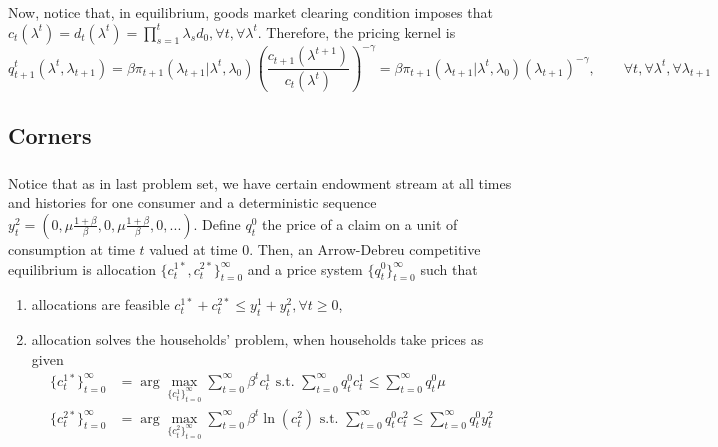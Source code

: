 \documentclass[]{article}
\begin{document}
Now, notice that, in equilibrium, goods market clearing condition imposes that $c_t(\lambda^t) = d_t(\lambda^t) = \prod\limits_{s = 1}^t\lambda_sd_0, \forall t, \forall \lambda^t$. Therefore, the pricing kernel is
\begin{equation}
	q_{t+1}^t(\lambda^t, \lambda_{t+1}) = \beta\pi_{t+1}(\lambda_{t+1}|\lambda^t, \lambda_0)\left(\frac{c_{t+1}(\lambda^{t+1})}{c_t(\lambda^t)}\right)^{-\gamma} = \beta\pi_{t+1}(\lambda_{t+1}|\lambda^t, \lambda_0)(\lambda_{t+1})^{-\gamma}, \qquad\forall t, \forall\lambda^t, \forall\lambda_{t+1} \nonumber
\end{equation}

\subsection{Corners}

\subsubsection{}
Notice that as in last problem set, we have certain endowment stream at all times and histories for one consumer and a deterministic sequence $y_t^2 = (0, \mu\frac{1 + \beta}{\beta}, 0, \mu\frac{1 + \beta}{\beta}, 0, ...)$. Define $q_t^0$ the price of a claim on a unit of consumption at time $t$ valued at time $0$. Then, an Arrow-Debreu competitive equilibrium is allocation $\{c_t^{1*}, c_t^{2*}\}_{t = 0}^{\infty}$ and a price system $\{q_t^0\}_{t = 0}^{\infty}$ such that
\begin{enumerate}[label = \roman*)]
	\item allocations are feasible $c_t^{1*} + c_t^{2*} \leq y_t^1 + y_t^2, \forall t\geq0$,
	\item allocation solves the households' problem, when households take prices as given
	\begin{equation}
		\begin{split}
			\{c_t^{1*}\}_{t = 0}^\infty& = \arg\max\limits_{\{c_t^1\}_{t = 0}^\infty}\sum\limits_{t = 0}^{\infty}\beta^tc_t^1\text{ s.t. }\sum\limits_{t = 0}^{\infty}q_t^0c_t^1\leq\sum\limits_{t = 0}^{\infty}q_t^0\mu \\
			\{c_t^{2*}\}_{t = 0}^\infty& = \arg\max\limits_{\{c_t^2\}_{t = 0}^\infty}\sum\limits_{t = 0}^{\infty}\beta^t\ln(c_t^2)\text{ s.t. }\sum\limits_{t = 0}^{\infty}q_t^0c_t^2\leq\sum\limits_{t = 0}^{\infty}q_t^0y_t^2\nonumber
		\end{split}
	\end{equation}
\end{enumerate}
\end{document}

